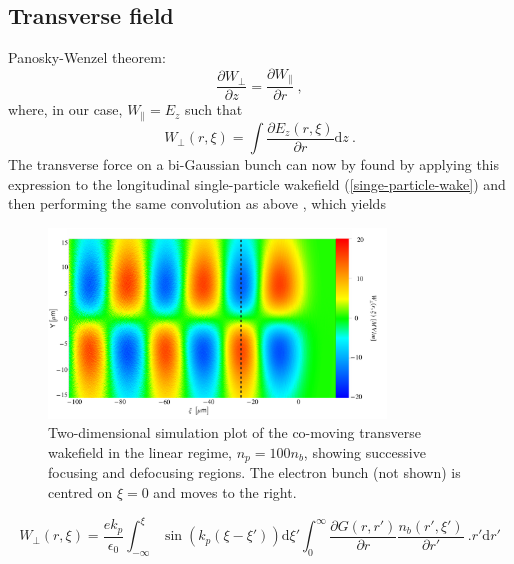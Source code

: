 \documentclass[%
onecolumn, notitlepage,
 amsmath,amssymb,
 aps,
]{article}
\begin{document}
\subsection*{Transverse field}
Panosky-Wenzel theorem:
\begin{equation}
\frac{\partial W_{\perp} }{\partial z}=\frac{\partial W_{\parallel} }{\partial r}~,
\end{equation} 
where, in our case, $W_{\parallel}=E_z$ such that
\begin{equation}
W_{\perp}(r,\xi)=\int \frac{\partial E_z(r,\xi) }{\partial r}\mathrm{d}z~.
\end{equation}
The transverse force on a bi-Gaussian bunch can now by found by applying this expression to the longitudinal single-particle wakefield (\ref{singe-particle-wake}) and then performing the same convolution as above \cite{Katsouleas1987, Mira2017}, which yields 
\begin{figure}
\centering
\includegraphics[width=0.8\textwidth]{transverse2d_final}
\caption{\small{Two-dimensional simulation plot of the co-moving transverse wakefield in the linear regime, $n_p=100n_b$, showing successive focusing and defocusing regions. The electron bunch (not shown) is centred on $\xi=0$ and moves to the right.}}
\label{transverse_plot}
\end{figure}
\begin{equation}
W_{\perp}(r,\xi)=\frac{e k_p}{\epsilon_0} \int_{-\infty}^{\xi} \sin(k_p(\xi-\xi'))\mathrm{d}\xi' \int_{0}^{\infty}\frac{\partial G\left(r,r'\right)}{\partial r} \frac{n_b(r',\xi')}{\partial r'}~.
r'\mathrm{d}r'
\label{transverse_wakefield}
\end{equation}
\end{document}

